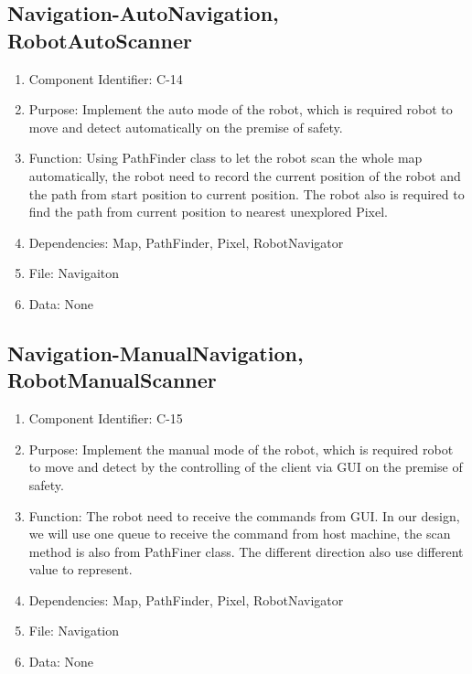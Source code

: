 \documentclass[11pt, a4paper]{report}
\begin{document}
\subsection{Navigation-AutoNavigation, RobotAutoScanner}
\begin{enumerate}
\item Component Identifier: C-14
\item Purpose: Implement the auto mode of the robot, which is required robot to move and detect automatically on the premise of safety.
\item Function: Using PathFinder class to let the robot scan the whole map automatically, the robot need to record the current position of the robot and the path from start position to current position. The robot also is required to find the path from current position to nearest unexplored Pixel.
\item Dependencies: Map, PathFinder, Pixel, RobotNavigator
\item File: Navigaiton
\item Data: None
\end{enumerate}

\subsection{Navigation-ManualNavigation, RobotManualScanner}
\begin{enumerate}
\item Component Identifier: C-15
\item Purpose: Implement the manual mode of the robot, which is required robot to move and detect by the controlling of the client via GUI on the premise of safety.
\item Function: The robot need to receive the commands from GUI. In our design, we will use one queue to receive the command from host machine, the scan method is also from PathFiner class. The different direction also use different value to represent.
\item Dependencies: Map, PathFinder, Pixel, RobotNavigator
\item File: Navigation
\item Data: None
\end{enumerate}
\end{document}
